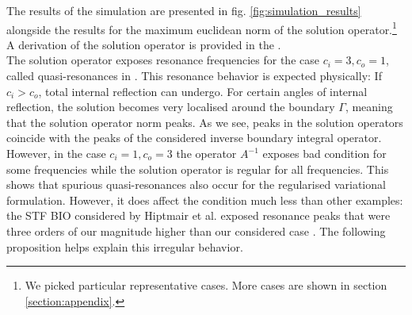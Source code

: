 \documentclass[12pt,journal,compsoc, onecolumn]{IEEEtran}
\begin{document}
\noindent
The results of the simulation are presented in fig. \ref{fig:simulation_results}  alongside the results for the maximum euclidean norm of the solution operator.\footnote{We picked particular representative cases. More cases are shown in section \ref{section:appendix}.} A derivation of the solution operator is provided in the . \\
The solution operator exposes resonance frequencies for the case $c_i = 3, c_o =1$, called  quasi-resonances  in \cite{hiptmair2021spurious}. This resonance behavior is expected physically: If $c_i > c_o$, total internal reflection can undergo. For certain angles of internal reflection, the solution becomes very localised around the boundary $\Gamma$, meaning that the solution operator norm peaks. As we see, peaks in the solution operators coincide with the peaks of the considered inverse boundary integral operator. 
However, in the case $c_i = 1, c_o = 3$ the operator $A^{-1}$ exposes bad condition for some frequencies while the solution operator is regular for all frequencies. This shows that spurious quasi-resonances also occur for the regularised variational formulation. However, it does affect the condition much less than other examples: the STF BIO considered by Hiptmair et al. exposed resonance peaks that were three orders of our magnitude  higher than our considered case \cite{hiptmair2021spurious}. The following proposition helps explain this irregular behavior.
\end{document}
